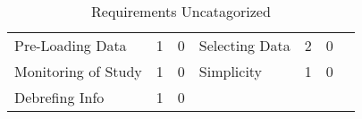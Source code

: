 \begin{table}[htbp]
\begin{tabular}{lcclccc}
        Pre-Loading Data                                           & 1                          & 0                         & Selecting Data                                              & 2                          & 0                         \\
        Monitoring of Study                                        & 1                          & 0                         & Simplicity                                                  & 1                          & 0                         \\
        Debrefing Info                                             & 1                          & 0                         & & & & \\\hline
        \end{tabular}
        \caption[Requirements Uncatagorized]{Requirements Uncatagorized}\label{tab:requirementsRaw1}
        \end{table}


